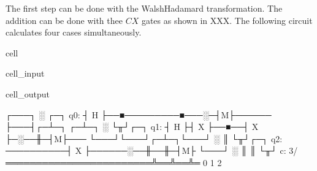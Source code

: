 \documentclass[letterpaper,10pt,english]{jupyterBook}
\begin{document}
\sphinxAtStartPar
The first step can be done with the Walsh\sphinxhyphen{}Hadamard transformation.  The addition can be done with thee \(CX\) gates as shown in XXX. The following circuit calculates four cases simultaneously.

\begin{sphinxuseclass}{cell}\begin{sphinxVerbatimInput}

\begin{sphinxuseclass}{cell_input}
\begin{sphinxVerbatim}[commandchars=\\\{\}]
   


\PYG{p}{[}\PYG{p}{]}
\end{sphinxVerbatim}

\end{sphinxuseclass}\end{sphinxVerbatimInput}
\begin{sphinxVerbatimOutput}

\begin{sphinxuseclass}{cell_output}
\begin{sphinxVerbatim}[commandchars=\\\{\}]
     ┌───┐                ░ ┌─┐
q\PYGZus{}0: ┤ H ├──■─────────■───░─┤M├──────
     ├───┤┌─┴─┐     ┌─┴─┐ ░ └╥┘┌─┐
q\PYGZus{}1: ┤ H ├┤ X ├──■──┤ X ├─░──╫─┤M├───
     └───┘└───┘┌─┴─┐└───┘ ░  ║ └╥┘┌─┐
q\PYGZus{}2: ──────────┤ X ├──────░──╫──╫─┤M├
               └───┘      ░  ║  ║ └╥┘
c: 3/════════════════════════╩══╩══╩═
                             0  1  2
\end{sphinxVerbatim}

\end{sphinxuseclass}\end{sphinxVerbatimOutput}

\end{sphinxuseclass}
\end{document}
